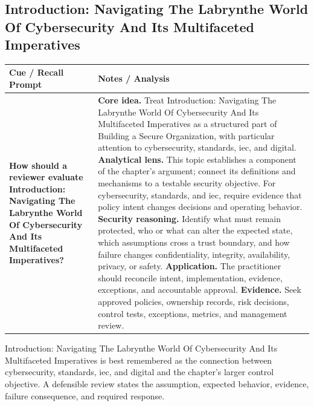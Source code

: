 \documentclass[11pt]{article}
\newcommand{\CornellHeader}{%
\rowcolor{Navy}\color{white}\bfseries Cue / Recall Prompt & \color{white}\bfseries Notes / Analysis\\\hline}
\newcommand{\CornellRow}[2]{%
\cellcolor{CueGray}\RaggedRight\textbf{#1} & \RaggedRight #2\\\hline}
\begin{document}
\subsection*{Introduction: Navigating The Labrynthe World Of Cybersecurity And Its Multifaceted Imperatives}
\begin{longtable}{>{\RaggedRight\arraybackslash}p{}|>{\RaggedRight\arraybackslash}p{}}
\CornellHeader
\CornellRow{How should a reviewer evaluate Introduction: Navigating The Labrynthe World Of Cybersecurity And Its Multifaceted Imperatives?}{\textbf{Core idea.} Treat Introduction: Navigating The Labrynthe World Of Cybersecurity And Its Multifaceted Imperatives as a structured part of Building a Secure Organization, with particular attention to cybersecurity, standards, iec, and digital. \textbf{Analytical lens.} This topic establishes a component of the chapter's argument; connect its definitions and mechanisms to a testable security objective. For cybersecurity, standards, and iec, require evidence that policy intent changes decisions and operating behavior. \textbf{Security reasoning.} Identify what must remain protected, who or what can alter the expected state, which assumptions cross a trust boundary, and how failure changes confidentiality, integrity, availability, privacy, or safety. \textbf{Application.} The practitioner should reconcile intent, implementation, evidence, exceptions, and accountable approval. \textbf{Evidence.} Seek approved policies, ownership records, risk decisions, control tests, exceptions, metrics, and management review.}
\end{longtable}
\begin{topicsummary}
Introduction: Navigating The Labrynthe World Of Cybersecurity And Its Multifaceted Imperatives is best remembered as the connection between cybersecurity, standards, iec, and digital and the chapter's larger control objective. A defensible review states the assumption, expected behavior, evidence, failure consequence, and required response.
\end{topicsummary}
\end{document}
